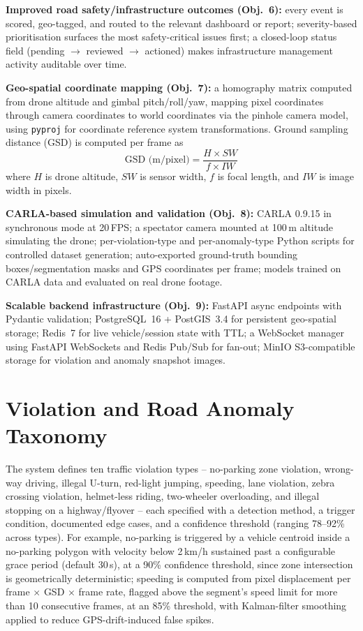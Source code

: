 \documentclass[conference]{IEEEtran}
\begin{document}
\textbf{Improved road safety/infrastructure outcomes (Obj.~6):} every event is scored, geo-tagged, and routed to the relevant dashboard or report; severity-based prioritisation surfaces the most safety-critical issues first; a closed-loop status field (pending $\to$ reviewed $\to$ actioned) makes infrastructure management activity auditable over time.

\textbf{Geo-spatial coordinate mapping (Obj.~7):} a homography matrix computed from drone altitude and gimbal pitch/roll/yaw, mapping pixel coordinates through camera coordinates to world coordinates via the pinhole camera model, using \texttt{pyproj} for coordinate reference system transformations. Ground sampling distance (GSD) is computed per frame as
\begin{equation}
\text{GSD (m/pixel)} = \frac{H \times SW}{f \times IW}
\end{equation}
where $H$ is drone altitude, $SW$ is sensor width, $f$ is focal length, and $IW$ is image width in pixels.

\textbf{CARLA-based simulation and validation (Obj.~8):} CARLA 0.9.15 in synchronous mode at 20\,FPS; a spectator camera mounted at 100\,m altitude simulating the drone; per-violation-type and per-anomaly-type Python scripts for controlled dataset generation; auto-exported ground-truth bounding boxes/segmentation masks and GPS coordinates per frame; models trained on CARLA data and evaluated on real drone footage.

\textbf{Scalable backend infrastructure (Obj.~9):} FastAPI async endpoints with Pydantic validation; PostgreSQL~16 + PostGIS~3.4 for persistent geo-spatial storage; Redis~7 for live vehicle/session state with TTL; a WebSocket manager using FastAPI WebSockets and Redis Pub/Sub for fan-out; MinIO S3-compatible storage for violation and anomaly snapshot images.

\section{Violation and Road Anomaly Taxonomy}
\label{sec:taxonomy}

The system defines ten traffic violation types -- no-parking zone violation, wrong-way driving, illegal U-turn, red-light jumping, speeding, lane violation, zebra crossing violation, helmet-less riding, two-wheeler overloading, and illegal stopping on a highway/flyover -- each specified with a detection method, a trigger condition, documented edge cases, and a confidence threshold (ranging 78--92\% across types). For example, no-parking is triggered by a vehicle centroid inside a no-parking polygon with velocity below 2\,km/h sustained past a configurable grace period (default 30\,s), at a 90\% confidence threshold, since zone intersection is geometrically deterministic; speeding is computed from pixel displacement per frame $\times$ GSD $\times$ frame rate, flagged above the segment's speed limit for more than 10 consecutive frames, at an 85\% threshold, with Kalman-filter smoothing applied to reduce GPS-drift-induced false spikes.
\end{document}
